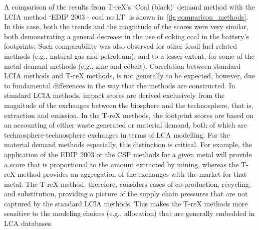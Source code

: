 A comparison of the results from T-reX's `Coal (black)' demand method with the LCIA method `EDIP 2003 - coal no LT' is shown in~\autoref{fig:comparison_methods}. In this case, both the trends and the magnitude of the scores were very similar, both demonstrating a general decrease in the use of coking coal in the battery's footprints. Such comparability was also observed for other fossil-fuel-related methods (e.g., natural gas and petroleum), and to a lesser extent, for some of the metal demand methods (e.g., zinc and cobalt). Correlation between standard LCIA methods and T-reX methods, is not generally to be expected, however, due to fundamental differences in the way that the methods are constructed. In standard LCIA methods, impact scores are derived exclusively from the magnitude of the exchanges between the biosphere and the technosphere, that is, extraction and emission. In the T-reX methods, the footprint scores are based on an accounting of either waste generated or material demand, both of which are technosphere-technosphere exchanges in terms of LCA modelling. For the material demand methods especially, this distinction is critical. For example, the application of the EDIP 2003 or the CSP methods for a given metal will provide a score that is proportional to the amount extracted by mining, whereas the T-reX method provides an aggregation of the exchanges with the market for that metal. The T-reX method, therefore, considers cases of co-production, recycling, and substitution, providing a picture of the supply chain pressures that are not captured by the standard LCIA methods. This makes the T-reX methods more sensitive to the modeling choices (e.g., allocation) that are generally embedded in LCA databases.


